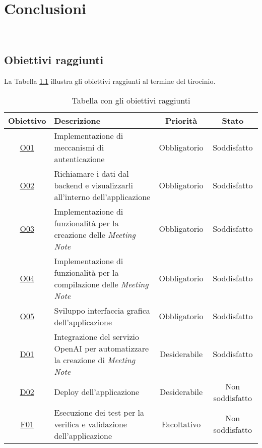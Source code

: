\chapter{Conclusioni}
\label{cap:conclusioni}

\\

\section{Obiettivi raggiunti}
\label{sec:raggiungimento-obiettivi}

La Tabella \ref{tab:obbiettivi-raggiunti} illustra gli obiettivi raggiunti al termine del tirocinio.

\begin{table}
    \centering
    \begin{tabularx}{\textwidth}{|c|X|c|c|}
        \hline
        \textbf{Obiettivo} & \textbf{Descrizione} & \textbf{Priorità} & \textbf{Stato} \\ \hline
        \hyperref[O01]{O01} & 
        Implementazione di meccanismi di autenticazione &
        Obbligatorio & 
        Soddisfatto \\ \hline
        \hyperref[O02]{O02} & 
        Richiamare i dati dal backend e visualizzarli all'interno dell'applicazione &
        Obbligatorio & 
        Soddisfatto \\ \hline
        \hyperref[O03]{O03} & 
        Implementazione di funzionalità per la creazione delle \textit{Meeting Note} &
        Obbligatorio & 
        Soddisfatto \\ \hline
        \hyperref[O04]{O04} & 
        Implementazione di funzionalità per la compilazione delle \textit{Meeting Note} &
        Obbligatorio & 
        Soddisfatto \\ \hline
        \hyperref[O05]{O05} & 
        Sviluppo interfaccia grafica dell'applicazione &
        Obbligatorio & 
        Soddisfatto \\ \hline
        \hyperref[D01]{D01} & 
        Integrazione del servizio OpenAI per automatizzare la creazione di \textit{Meeting Note} &
        Desiderabile & 
        Soddisfatto \\ \hline
        \hyperref[D02]{D02} & 
        Deploy dell'applicazione &
        Desiderabile & 
        Non soddisfatto \\ \hline
        \hyperref[F01]{F01} & 
        Esecuzione dei test per la verifica e validazione dell'applicazione &
        Facoltativo & 
        Non soddisfatto \\ \hline
    \end{tabularx}%
\caption{Tabella con gli obiettivi raggiunti}
\label{tab:obbiettivi-raggiunti}
\end{table}

